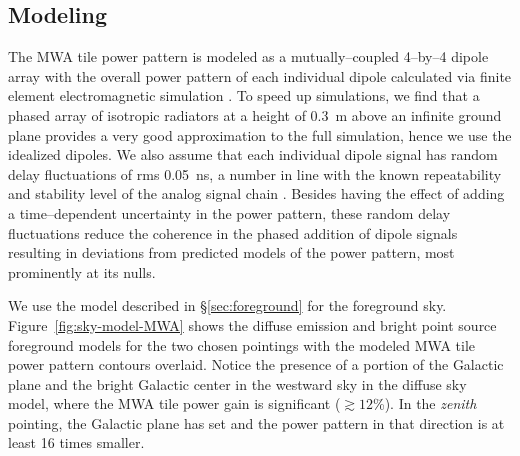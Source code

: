 \documentclass[preprint2,iop,numberedappendix]{emulateapj}
\begin{document}
\subsection{Modeling}\label{sec:modeling}

The MWA tile power pattern is modeled as a mutually--coupled 4--by--4 dipole array with the overall power pattern of each individual dipole calculated via finite element electromagnetic simulation \citep{sut14_arXiv}. To speed up simulations, we find that a phased array of isotropic radiators at a height of 0.3~m above an infinite ground plane provides a very good approximation to the full simulation, hence we use the idealized dipoles. We also assume that each individual dipole signal has random delay fluctuations of rms 0.05~ns, a number in line with the known repeatability and stability level of the analog signal chain \citep{bow07b}. Besides having the effect of adding a time--dependent uncertainty in the power pattern, these random delay fluctuations reduce the coherence in the phased addition of dipole signals resulting in deviations from predicted models of the power pattern, most prominently at its nulls. 

We use the model described in \S\ref{sec:foreground} for the foreground sky. Figure~\ref{fig:sky-model-MWA} shows the diffuse emission and bright point source foreground models for the two chosen pointings with the modeled MWA tile power pattern contours overlaid. Notice the presence of a portion of the Galactic plane and the bright Galactic center in the westward sky in the diffuse sky model, where the MWA tile power gain is significant ($\gtrsim 12$\%). In the {\it zenith} pointing, the Galactic plane has set and the power pattern in that direction is at least 16 times smaller. 
\end{document}
